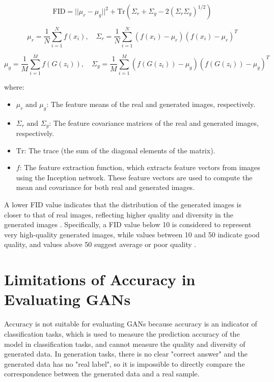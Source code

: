 \begin{equation}
    \text{FID} = || \mu_r - \mu_g ||^2 + \text{Tr}(\Sigma_r + \Sigma_g - 2(\Sigma_r \Sigma_g)^{1/2})
\end{equation}


\begin{equation}
    \mu_r = \frac{1}{N} \sum_{i=1}^{N} f(x_i), \quad \Sigma_r = \frac{1}{N} \sum_{i=1}^{N} (f(x_i) - \mu_r)(f(x_i) - \mu_r)^T
\end{equation}

\begin{equation}
    \mu_g = \frac{1}{M} \sum_{i=1}^{M} f(G(z_i)), \quad \Sigma_g = \frac{1}{M} \sum_{i=1}^{M} (f(G(z_i)) - \mu_g)(f(G(z_i)) - \mu_g)^T
\end{equation}

where:

\begin{itemize}
    \item \(\mu_r \text{ and } \mu_g\): The feature means of the real and generated images, respectively.
    \item \(\Sigma_r \text{ and } \Sigma_g\): The feature covariance matrices of the real and generated images, respectively.
    \item \(\text{Tr}\): The trace (the sum of the diagonal elements of the matrix).
    \item \(f\): The feature extraction function, which extracts feature vectors from images using the Inception network. These feature vectors are used to compute the mean and covariance for both real and generated images.
\end{itemize}

A lower FID value indicates that the distribution of the generated images is closer to that of real images, 
reflecting higher quality and diversity in the generated images \citep{10.1117/12.2673366}. 
Specifically, a FID value below 10 is considered to represent very high-quality generated images, 
while values between 10 and 50 indicate good quality, and values above 50 suggest average or poor quality \citep{10.1117/12.2673366}.



\section{Limitations of Accuracy in Evaluating GANs}
Accuracy is not suitable for evaluating GANs because accuracy is an indicator of classification tasks, 
which is used to measure the prediction accuracy of the model in classification tasks, and cannot 
measure the quality and diversity of generated data. In generation tasks, there is no clear 
"correct answer" and the generated data has no "real label", so it is impossible to directly 
compare the correspondence between the generated data and a real sample. 

